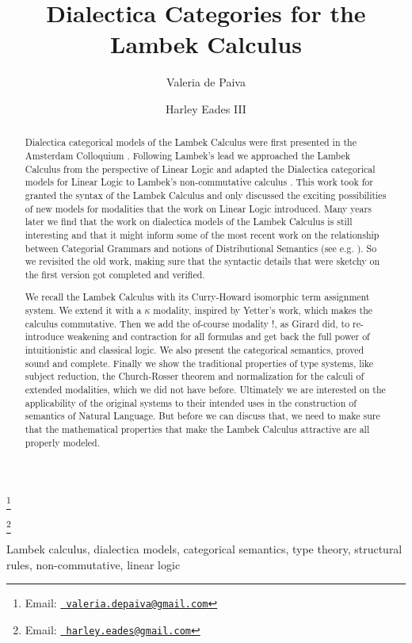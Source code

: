 \documentclass{entcs}
\begin{document}
\begin{frontmatter}
  \title{Dialectica Categories for the Lambek Calculus}
  \author{Valeria de Paiva}
  \address{Nuance Communications, Sunnyvale, CA}

  \author{Harley Eades III}
  \address{Computer Science, Augusta University, Augusta, GA}

  \thanks[Vemail]{Email:
    \href{mailto:valeria.depaiva@gmail.com} {\texttt{\normalshape
        valeria.depaiva@gmail.com}}}

  \thanks[Hemail]{Email:
    \href{mailto:harley.eades@gmail.com} {\texttt{\normalshape
        harley.eades@gmail.com}}}
  \begin{abstract}
    Dialectica categorical models of the Lambek Calculus were first
    presented in the Amsterdam Colloquium \cite{depaiva1991}. Following
    Lambek's lead we approached the Lambek Calculus from the perspective
    of Linear Logic and adapted the Dialectica categorical models for
    Linear Logic to Lambek's non-commutative calculus
    \cite{lambek1988}. This work took for granted the syntax of the
    Lambek Calculus and only discussed the exciting possibilities of new
    models for modalities that the work on Linear Logic introduced. Many
    years later we find that the work on dialectica models of the Lambek
    Calculus is still interesting and that it might inform some of the
    most recent work on the relationship between Categorial Grammars and
    notions of Distributional Semantics (see e.g. \cite{coecke2013}).
    So we revisited the old work, making sure that the syntactic details
    that were sketchy on the first version got completed and verified.

    We recall the Lambek Calculus with its Curry-Howard isomorphic
    term assignment system. We extend it with a $\kappa$ modality,
    inspired by Yetter's work, which makes the calculus
    commutative. Then we add the of-course modality $!$, as Girard
    did, to re-introduce weakening and contraction for all formulas
    and get back the full power of intuitionistic and classical
    logic. We also present the categorical semantics, proved sound and
    complete. Finally we show the traditional properties of type
    systems, like subject reduction, the Church-Rosser theorem and
    normalization for the calculi of extended modalities, which we did
    not have before.  Ultimately we are interested on the
    applicability of the original systems to their intended uses in
    the construction of semantics of Natural Language. But before we
    can discuss that, we need to make sure that the mathematical
    properties that make the Lambek Calculus attractive are all
    properly modeled.
  \end{abstract}
\begin{keyword}
  Lambek calculus, dialectica models, categorical semantics, type theory, structural rules, non-commutative, linear logic
\end{keyword}
\end{frontmatter}
\end{document}
